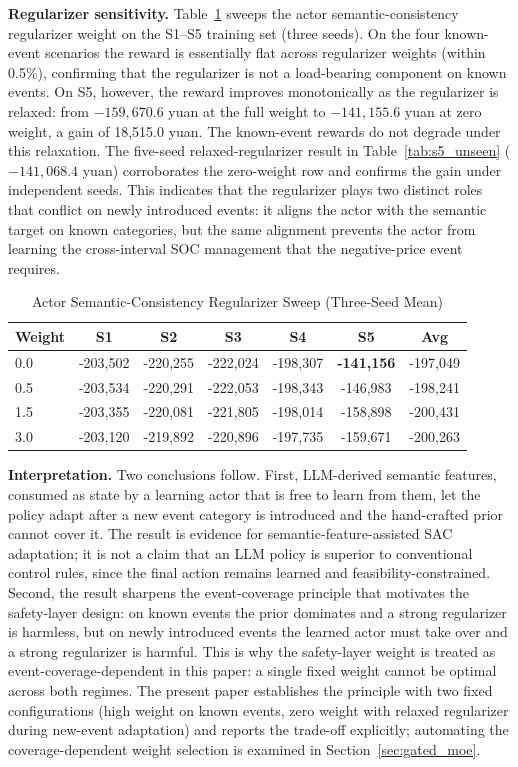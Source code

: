 \documentclass{ieeeaccess}
\begin{document}
\textbf{Regularizer sensitivity.} Table~\ref{tab:actor_loss_sweep} sweeps the actor semantic-consistency regularizer weight on the S1--S5 training set (three seeds). On the four known-event scenarios the reward is essentially flat across regularizer weights (within 0.5\%), confirming that the regularizer is not a load-bearing component on known events. On S5, however, the reward improves monotonically as the regularizer is relaxed: from $-159{,}670.6$ yuan at the full weight to $-141{,}155.6$ yuan at zero weight, a gain of 18{,}515.0 yuan. The known-event rewards do not degrade under this relaxation. The five-seed relaxed-regularizer result in Table~\ref{tab:s5_unseen} ($-141{,}068.4$ yuan) corroborates the zero-weight row and confirms the gain under independent seeds. This indicates that the regularizer plays two distinct roles that conflict on newly introduced events: it aligns the actor with the semantic target on known categories, but the same alignment prevents the actor from learning the cross-interval SOC management that the negative-price event requires.

\begin{table}[t!]
\caption{Actor Semantic-Consistency Regularizer Sweep (Three-Seed Mean)}
\label{tab:actor_loss_sweep}
\centering
\begin{tabular}{lcccccc}
\toprule
\textbf{Weight} & \textbf{S1} & \textbf{S2} & \textbf{S3} & \textbf{S4} & \textbf{S5} & \textbf{Avg} \\
\midrule
0.0 & -203,502 & -220,255 & -222,024 & -198,307 & \textbf{-141,156} & -197,049 \\
0.5 & -203,534 & -220,291 & -222,053 & -198,343 & -146,983 & -198,241 \\
1.5 & -203,355 & -220,081 & -221,805 & -198,014 & -158,898 & -200,431 \\
3.0 & -203,120 & -219,892 & -220,896 & -197,735 & -159,671 & -200,263 \\
\bottomrule
\end{tabular}
\end{table}

\textbf{Interpretation.} Two conclusions follow. First, LLM-derived semantic features, consumed as state by a learning actor that is free to learn from them, let the policy adapt after a new event category is introduced and the hand-crafted prior cannot cover it. The result is evidence for semantic-feature-assisted SAC adaptation; it is not a claim that an LLM policy is superior to conventional control rules, since the final action remains learned and feasibility-constrained. Second, the result sharpens the event-coverage principle that motivates the safety-layer design: on known events the prior dominates and a strong regularizer is harmless, but on newly introduced events the learned actor must take over and a strong regularizer is harmful. This is why the safety-layer weight is treated as event-coverage-dependent in this paper: a single fixed weight cannot be optimal across both regimes. The present paper establishes the principle with two fixed configurations (high weight on known events, zero weight with relaxed regularizer during new-event adaptation) and reports the trade-off explicitly; automating the coverage-dependent weight selection is examined in Section~\ref{sec:gated_moe}.
\end{document}
